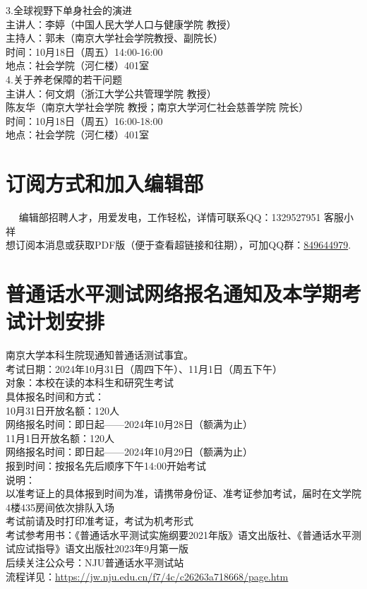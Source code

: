 \documentclass[letterpaper, 12pt]{article}
\begin{document}
\begin{multicols}{2}
3.全球视野下单身社会的演进\\
主讲人：李婷（中国人民大学人口与健康学院 教授）\\
主持人：郭未（南京大学社会学院教授、副院长）\\
时间：10月18日（周五）14:00-16:00\\
地点：社会学院（河仁楼）401室\\

4.关于养老保障的若干问题\\
主讲人：何文炯（浙江大学公共管理学院 教授）\\
陈友华（南京大学社会学院 教授；南京大学河仁社会慈善学院 院长）\\
时间：10月18日（周五）16:00-18:00\\
地点：社会学院（河仁楼）401室\\

\section{订阅方式和加入编辑部}  
编辑部招聘人才，用爱发电，工作轻松，详情可联系QQ：1329527951 客服小祥\\想订阅本消息或获取PDF版（便于查看超链接和往期），可加QQ群：\href{https://qm.qq.com/q/FGX1VYCrGS}{849644979}.




\section{普通话水平测试网络报名通知及本学期考试计划安排}
南京大学本科生院现通知普通话测试事宜。\\
考试日期：2024年10月31日（周四下午）、11月1日（周五下午）\\
对象：本校在读的本科生和研究生考试\\
具体报名时间和方式：\\
10月31日开放名额：120人\\
网络报名时间：即日起——2024年10月28日（额满为止）\\
11月1日开放名额：120人\\
网络报名时间：即日起——2024年10月29日（额满为止）\\
报到时间：按报名先后顺序下午14:00开始考试\\
说明：\\
以准考证上的具体报到时间为准，请携带身份证、准考证参加考试，届时在文学院4楼435房间依次排队入场\\
考试前请及时打印准考证，考试为机考形式\\
考试参考用书：《普通话水平测试实施纲要2021年版》语文出版社、《普通话水平测试应试指导》语文出版社2023年9月第一版\\
后续关注公众号：NJU普通话水平测试站\\
流程详见：\url{https://jw.nju.edu.cn/f7/4c/c26263a718668/page.htm}\\


\end{multicols}
\end{document}
